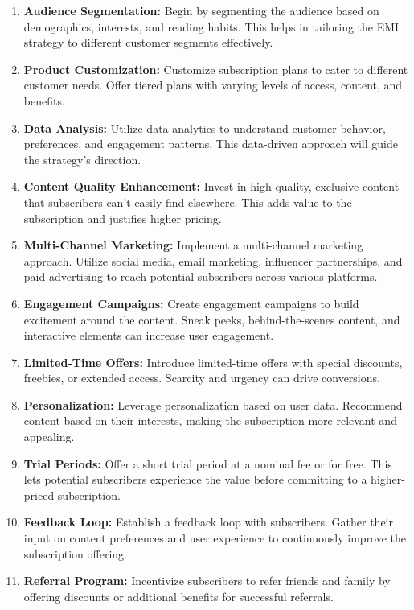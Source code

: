 \begin{enumerate}
    \item \textbf{Audience Segmentation:} Begin by segmenting the audience based on demographics, interests, and reading habits. This helps in tailoring the EMI strategy to different customer segments effectively.
    
    \item \textbf{Product Customization:} Customize subscription plans to cater to different customer needs. Offer tiered plans with varying levels of access, content, and benefits.
    
    \item \textbf{Data Analysis:} Utilize data analytics to understand customer behavior, preferences, and engagement patterns. This data-driven approach will guide the strategy's direction.
    
    \item \textbf{Content Quality Enhancement:} Invest in high-quality, exclusive content that subscribers can't easily find elsewhere. This adds value to the subscription and justifies higher pricing.
    
    \item \textbf{Multi-Channel Marketing:} Implement a multi-channel marketing approach. Utilize social media, email marketing, influencer partnerships, and paid advertising to reach potential subscribers across various platforms.
    
    \item \textbf{Engagement Campaigns:} Create engagement campaigns to build excitement around the content. Sneak peeks, behind-the-scenes content, and interactive elements can increase user engagement.
    
    \item \textbf{Limited-Time Offers:} Introduce limited-time offers with special discounts, freebies, or extended access. Scarcity and urgency can drive conversions.
    
    \item \textbf{Personalization:} Leverage personalization based on user data. Recommend content based on their interests, making the subscription more relevant and appealing.
    
    \item \textbf{Trial Periods:} Offer a short trial period at a nominal fee or for free. This lets potential subscribers experience the value before committing to a higher-priced subscription.
    
    \item \textbf{Feedback Loop:} Establish a feedback loop with subscribers. Gather their input on content preferences and user experience to continuously improve the subscription offering.
    
    \item \textbf{Referral Program:} Incentivize subscribers to refer friends and family by offering discounts or additional benefits for successful referrals.
\end{enumerate}

